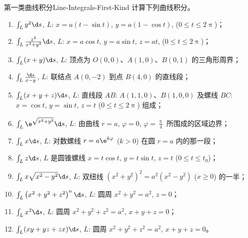 \begin{problem}{第一类曲线积分}{Line-Integrals-First-Kind}
    计算下列曲线积分。
    \begin{enumerate}
        \item $\int_{L} y^{2} \d s$, $L$: $x=a(t-\sin t)$, $y=a(1-\cos t)$, ($0 \leqslant t \leqslant 2 \uppi$)；
        \item $\int_{L} \frac{z^{2}}{x^{2}+y^{2}} \d s$, $L$: $x=a \cos t$, $y=a \sin t$, $z=a t$, ($0 \leqslant t \leqslant 2 \uppi$)；
        \item $\int_{L}(x+y) \d s$, $L$: 顶点为 $O(0,0)$、$A(1,0)$、$B(0,1)$ 的三角形周界；
        \item $\int_{L} \frac{\d s}{x-y}$, $L$: 联结点 $A(0,-2)$ 到点 $B(4,0)$ 的直线段；
        \item $\int_{L}(x+y+z) \d s$, $L$: 直线段 $AB$: $A(1,1,0)$、$B(1,0,0)$ 及螺线 $BC$: $x=\cos t$, $y=\sin t$, $z=t$ ($0 \leqslant t \leqslant 2 \uppi$) 组成；
        \item $\int_{L} \e^{\sqrt{x^{2}+y^{2}}} \d s$, $L$: 由曲线 $r=a$, $\varphi=0$, $\varphi=\frac{\uppi}{4}$ 所围成的区域边界；
        \item $\int_{L} x \d s$, $L$: 对数螺线 $r=a \e^{k \varphi}$ ($k>0$) 在圆 $r=a$ 内的那一段；
        \item $\int_{L} z \d s$, $L$ 是圆锥螺线 $x=t \cos t$, $y=t \sin t$, $z=t$ ($0 \leqslant t \leqslant t_{0}$)；
        \item $\int_{L} x \sqrt{x^{2}-y^{2}} \d s$, $L$: 双纽线 $\left(x^{2}+y^{2}\right)^{2}=a^{2}\left(x^{2}-y^{2}\right)$ ($x \geqslant 0$) 的一半；
        \item $\int_{L}\left(x^{2}+y^{2}+z^{2}\right)^{n} \d s$, $L$: 圆周 $x^{2}+y^{2}=a^{2}$, $z=0$；
        \item $\int_{L} x^{2} \d s$, $L$: 圆周 $x^{2}+y^{2}+z^{2}=a^{2}$, $x+y+z=0$；
        \item $\int_{L}(x y+y z+z x) \d s$, $L$: 圆周 $x^{2}+y^{2}+z^{2}=a^{2}$, $x+y+z=0$。
    \end{enumerate}
\end{problem}

